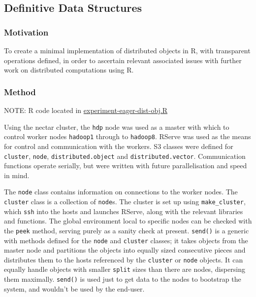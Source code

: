 \subsection{Definitive Data Structures}\label{sec:mw-ds}

\hypertarget{motivation}{%
\subsubsection{Motivation}\label{motivation}}

To create a minimal implementation of distributed objects in R, with
transparent operations defined, in order to ascertain relevant
associated issues with further work on distributed computations using R.

\hypertarget{method}{%
\subsubsection{Method}\label{method}}

NOTE: R code located in
\href{github.com/jcai89/phd/src/experiment-eager-dist-obj.R}{experiment-eager-dist-obj.R}

Using the nectar cluster, the \texttt{hdp} node was used as a master
with which to control worker nodes \texttt{hadoop1} through to
\texttt{hadoop8}. RServe was used as the means for control and
communication with the workers. S3 classes were defined for
\texttt{cluster}, \texttt{node}, \texttt{distributed.object} and
\texttt{distributed.vector}. Communication functions operate serially,
but were written with future parallelisation and speed in mind.

The \texttt{node} class contains information on connections to the
worker nodes. The \texttt{cluster} class is a collection of
\texttt{node}s. The cluster is set up using \texttt{make\_cluster},
which \texttt{ssh} into the hosts and launches RServe, along with the
relevant libraries and functions. The global environment local to
specific nodes can be checked with the \texttt{peek} method, serving
purely as a sanity check at present. \texttt{send()} is a generic with
methods defined for the \texttt{node} and \texttt{cluster} classes; it
takes objects from the master node and partitions the objects into
equally sized consecutive pieces and distributes them to the hosts
referenced by the \texttt{cluster} or \texttt{node} objects. It can
equally handle objects with smaller \texttt{split} sizes than there are
nodes, dispersing them maximally. \texttt{send()} is used just to get
data to the nodes to bootstrap the system, and wouldn't be used by the
end-user.

